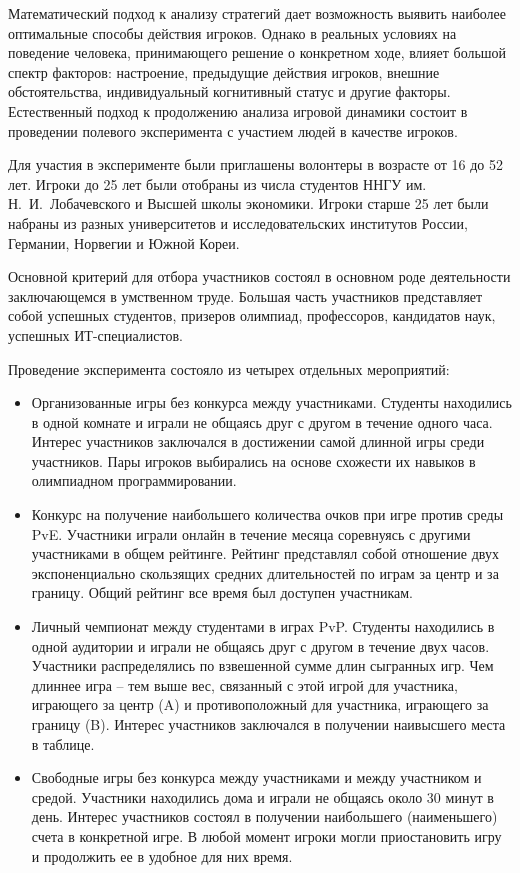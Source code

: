 Математический подход к анализу стратегий дает возможность выявить наиболее оптимальные способы действия игроков. Однако в реальных условиях на поведение человека, принимающего решение о конкретном ходе, влияет большой спектр факторов: настроение, предыдущие действия игроков, внешние обстоятельства, индивидуальный когнитивный статус и другие факторы. Естественный подход к продолжению анализа игровой динамики состоит в проведении полевого эксперимента с участием людей в качестве игроков. 

Для участия в эксперименте были приглашены волонтеры в возрасте от 16 до 52 лет. Игроки до 25 лет были отобраны из числа студентов ННГУ им. Н.~И.~Лобачевского и Высшей школы экономики. Игроки старше 25 лет были набраны из разных университетов и исследовательских институтов России, Германии, Норвегии и Южной Кореи.

Основной критерий для отбора участников состоял в основном роде деятельности заключающемся в умственном труде. Большая часть участников представляет собой успешных студентов, призеров олимпиад, профессоров, кандидатов наук, успешных ИТ-специалистов.

Проведение эксперимента состояло из четырех отдельных мероприятий:
\begin{itemize}
\item Организованные игры без конкурса между участниками. Студенты находились в одной комнате и играли не общаясь друг с другом в течение одного часа. Интерес участников заключался в достижении самой длинной игры среди участников. Пары игроков выбирались на основе схожести их навыков в олимпиадном программировании.
\item Конкурс на получение наибольшего количества очков при игре против среды PvE. Участники играли онлайн в течение месяца соревнуясь с другими участниками в общем рейтинге. Рейтинг представлял собой отношение двух экспоненциально скользящих средних длительностей по играм за центр и за границу. Общий рейтинг все время был доступен участникам.
\item Личный чемпионат между студентами в играх PvP. Студенты находились в одной аудитории и играли не общаясь друг с другом в течение двух часов. Участники распределялись по взвешенной сумме длин сыгранных игр. Чем длиннее игра -- тем выше вес, связанный с этой игрой для участника, играющего за центр (A) и противоположный для участника, играющего за границу (B). Интерес участников заключался в получении наивысшего места в таблице.
\item Свободные игры без конкурса между участниками и между участником и средой. Участники находились дома и играли не общаясь около 30 минут в день. Интерес участников состоял в получении наибольшего (наименьшего) счета в конкретной игре. В любой момент игроки могли приостановить игру и продолжить ее в удобное для них время.
\end{itemize}

